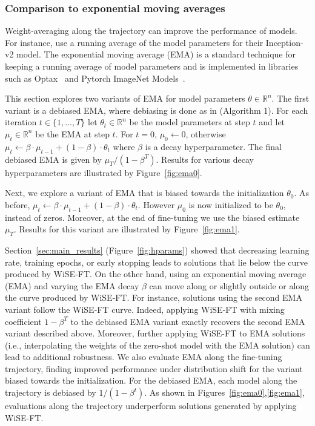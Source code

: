 \subsubsection{Comparison to exponential moving averages}\label{sec:ema}

Weight-averaging along the trajectory can improve the performance of models.
For instance, \citet{szegedy2016rethinking} use a running average of the model parameters for their Inception-v2 model.
The exponential moving average (EMA) is a standard technique for keeping a running average of model parameters and
is implemented in libraries such as Optax~\cite{optax2020github} and Pytorch ImageNet Models~\cite{rw2019timm}.

This section explores two variants of EMA for model parameters $\theta \in \mathbb{R}^n$. The first variant is a debiased EMA, where debiasing is done as in \citet{kingma2014adam} (Algorithm 1).
For each iteration $t \in \{1,...,T\}$ let $\theta_t \in \mathbb{R}^n$ be the model parameters at step $t$ and let $\mu_t \in \mathbb{R}^n$ be the EMA at step $t$. For $t = 0$, $\mu_0 \gets 0$, otherwise $\mu_t \gets \beta \cdot \mu_{t - 1} + (1-\beta) \cdot \theta_t$ where $\beta$ is a decay hyperparameter. 
The final debiased EMA is given by $\mu_T / (1 - \beta^T)$. Results for various decay hyperparameters are illustrated by Figure~\ref{fig:ema0}.

Next, we explore a variant of EMA that is biased towards the initialization $\theta_0$. As before, $\mu_t \gets \beta \cdot \mu_{t - 1} + (1-\beta) \cdot \theta_t$. However $\mu_0$ is now initialized to be $\theta_0$, instead of zeros. Moreover, at the end of fine-tuning we use the biased estimate $\mu_T$. Results for this variant are illustrated by Figure~\ref{fig:ema1}.

Section~\ref{sec:main_results} (Figure~\ref{fig:hparams}) showed that decreasing learning rate, training epochs, or early stopping leads to solutions that lie below the curve produced by WiSE-FT.
On the other hand, using an exponential moving average (EMA) and varying the EMA decay $\beta$ can move along or slightly outside or along the curve produced
by WiSE-FT.
For instance, solutions using the second EMA variant follow the WiSE-FT curve.
Indeed, applying WiSE-FT with mixing coefficient $1-\beta^T$ to the debiased EMA variant exactly recovers the second EMA variant described above.
Moreover, further applying WiSE-FT to EMA solutions (i.e., interpolating the weights of the zero-shot model with the EMA solution)
can lead to additional robustness. %
We also evaluate EMA along the fine-tuning trajectory,
finding improved performance under distribution shift for the variant biased towards the initialization.
For the debiased EMA, each model along the trajectory is debiased by $1 / (1 - \beta^t)$.
As shown in Figures~\ref{fig:ema0},\ref{fig:ema1}, evaluations along the trajectory underperform solutions generated by applying WiSE-FT.


